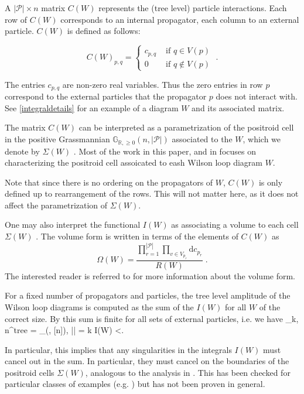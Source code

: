 \documentclass[11pt]{article}
\newcommand{\R}{\mathbb{R}}
\newcommand{\Gr}{\mathbb{G}_{\R, \geq 0}}
\def\bas #1\eas{\begin{align*} #1 \end{align*}}
\newcommand{\cP}{\mathcal{P}}
\theoremstyle{remark}
\theoremstyle{definition}
\begin{document}
A $|\cP| \times n$ matrix $C(W)$ represents the (tree level) particle interactions. Each row of $C(W)$ corresponds to an internal propagator, each column to an external particle. $C(W)$ is defined as follows:

\begin{equation} C(W)_{p,q} = \begin{cases} c_{p,q} & \textrm{ if } q \in V(p) \\
0  & \textrm{ if } q \not \in V(p)  \end{cases}
\;. \label{C(W) dfn}\end{equation}  

The entries $c_{p,q}$ are non-zero real variables. Thus the zero entries in row $p$ correspond to the external particles that the propagator $p$ does not interact with. See \ref{integraldetails} for an example of a diagram $W$ and its associated matrix.

The matrix $C(W)$ can be interpreted as a parametrization of the positroid cell in the positive Grassmannian $\Gr(n, |\cP|)$ associated to the $W$, which we denote by $\Sigma(W)$ \cite{wilsonloop}. Most of the work in this paper, and in \cite{generalcombinatoricsI} focuses on characterizing the positroid cell assoicated to eash Wilson loop diagram $W$. 

Note that since there is no ordering on the propagators of $W$, $C(W)$ is only defined up to rearrangement of the rows. This will not matter here, as it does not affect the parametrization of $\Sigma(W)$.

One may also interpret the functional $I(W)$ as associating a volume to each cell $\Sigma(W)$ \cite{wilsonloop, Amplituhedronsquared, HeslopStewart}. The volume form is written in terms of the elements of $C(W)$ as  \[ \Omega(W) = \frac{\prod_{r=1}^{|\cP|} \prod_{v \in V_{p_r}} \textrm{d}c_{p_r}}{R(W)} \;. \]
The interested reader is referred to \cite{Adamo:2012xe,HeslopStewart,LipsteinMason} for more information about the volume form. 

For a fixed number of propagators and particles, the tree level amplitude of the Wilson loop diagrams is computed as the sum of the $I(W)$ for all $W$ of the correct size. By \cite{Adamo:2011pv,Adamo:2012xe,Arkani-Hamed:2013jha} this sum is finite for all sets of external particles, i.e. we have \bas \mathcal{A}_{k, n}^{tree} = \sum_{(\cP, [n]), |\cP| = k} I(W) <\infty. \eas

In particular, this implies that any singularities in the integrals $I(W)$ must cancel out in the sum. In particular, they must cancel on the boundaries of the positroid cells $\Sigma(W)$, analogous to the analysis in \cite{Arkani-Hamed:2013jha}. This has been checked for particular classes of examples (e.g. \cite{casestudy, Amplituhedronsquared, HeslopStewart}) but has not been proven in general.
\end{document}
